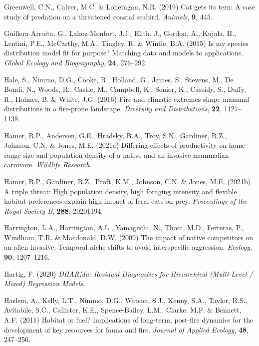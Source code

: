 \documentclass[11pt,a4paper,titlepage,twoside,openright]{style/unimelbthesis}
\begin{document}
\begin{mainmatter}
\leavevmode\hypertarget{ref-greenwell2019cat}{}%
Greenwell, C.N., Calver, M.C. \& Loneragan, N.R. (2019) Cat gets its tern: A case study of predation on a threatened coastal seabird. \emph{Animals}, \textbf{9}, 445.

\leavevmode\hypertarget{ref-guillera2015my}{}%
Guillera-Arroita, G., Lahoz-Monfort, J.J., Elith, J., Gordon, A., Kujala, H., Lentini, P.E., McCarthy, M.A., Tingley, R. \& Wintle, B.A. (2015) Is my species distribution model fit for purpose? Matching data and models to applications. \emph{Global Ecology and Biogeography}, \textbf{24}, 276--292.

\leavevmode\hypertarget{ref-hale2016fire}{}%
Hale, S., Nimmo, D.G., Cooke, R., Holland, G., James, S., Stevens, M., De Bondi, N., Woods, R., Castle, M., Campbell, K., Senior, K., Cassidy, S., Duffy, R., Holmes, B. \& White, J.G. (2016) Fire and climatic extremes shape mammal distributions in a fire-prone landscape. \emph{Diversity and Distributions}, \textbf{22}, 1127--1138.

\leavevmode\hypertarget{ref-hamer2021differing}{}%
Hamer, R.P., Andersen, G.E., Hradsky, B.A., Troy, S.N., Gardiner, R.Z., Johnson, C.N. \& Jones, M.E. (2021a) Differing effects of productivity on home-range size and population density of a native and an invasive mammalian carnivore. \emph{Wildlife Research}.

\leavevmode\hypertarget{ref-hamer2021triple}{}%
Hamer, R.P., Gardiner, R.Z., Proft, K.M., Johnson, C.N. \& Jones, M.E. (2021b) A triple threat: High population density, high foraging intensity and flexible habitat preferences explain high impact of feral cats on prey. \emph{Proceedings of the Royal Society B}, \textbf{288}, 20201194.

\leavevmode\hypertarget{ref-harrington2009impact}{}%
Harrington, L.A., Harrington, A.L., Yamaguchi, N., Thom, M.D., Ferreras, P., Windham, T.R. \& Macdonald, D.W. (2009) The impact of native competitors on an alien invasive: Temporal niche shifts to avoid interspecific aggression. \emph{Ecology}, \textbf{90}, 1207--1216.

\leavevmode\hypertarget{ref-DHARMa}{}%
Hartig, F. (2020) \emph{DHARMa: Residual Diagnostics for Hierarchical (Multi-Level / Mixed) Regression Models}.

\leavevmode\hypertarget{ref-haslem2011habitat}{}%
Haslem, A., Kelly, L.T., Nimmo, D.G., Watson, S.J., Kenny, S.A., Taylor, R.S., Avitabile, S.C., Callister, K.E., Spence-Bailey, L.M., Clarke, M.F. \& Bennett, A.F. (2011) Habitat or fuel? Implications of long-term, post-fire dynamics for the development of key resources for fauna and fire. \emph{Journal of Applied Ecology}, \textbf{48}, 247--256.


\end{mainmatter}
\end{document}
